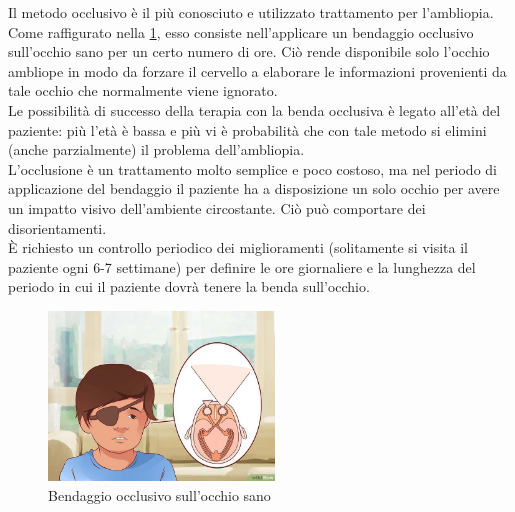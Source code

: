 \documentclass[12pt,a4paper,openright,twoside]{book}
\begin{document}
	 Il metodo occlusivo è il più conosciuto e utilizzato trattamento per l'ambliopia. Come raffigurato nella \figurename \ref{fig:metoccl},
	 esso consiste nell'applicare un bendaggio occlusivo sull'occhio sano per un certo numero di ore. Ciò rende disponibile solo l'occhio 
	 ambliope in modo da forzare il cervello a elaborare le informazioni provenienti da tale occhio che normalmente viene ignorato.\\
	 Le possibilità di successo della terapia con la benda occlusiva è legato all'età del paziente: più l'età è bassa e più vi è probabilità che con tale metodo si elimini (anche parzialmente) il problema dell'ambliopia.\\
	 L'occlusione è un trattamento molto semplice e poco costoso, ma nel periodo di applicazione del bendaggio il paziente ha a disposizione un solo occhio per avere un impatto visivo dell'ambiente circostante. Ciò può comportare dei disorientamenti.\\
	 È richiesto un controllo periodico dei miglioramenti (solitamente si visita il paziente ogni 6-7 settimane) per definire le ore giornaliere e la lunghezza del periodo in cui il paziente dovrà 
	 tenere la benda sull'occhio.\\
	  \begin{figure}[h]
	 	\centering   	
	 	\includegraphics[width=60mm]{metoccl.jpg}
	 	\caption{Bendaggio occlusivo sull'occhio sano}
	 	\label{fig:metoccl}
	 \end{figure}
\end{document}
